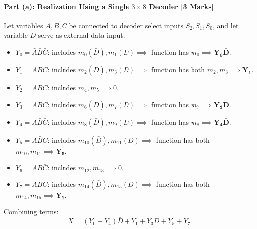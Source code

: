 \documentclass[11pt,a4paper,oneside]{book}
\begin{document}
\paragraph{Part (a): Realization Using a Single $3 \times 8$ Decoder [3 Marks]}
Let variables $A, B, C$ be connected to decoder select inputs $S_2, S_1, S_0$, and let variable $D$ serve as external data input:
\begin{itemize}
  \item $Y_0 = \bar{A}\bar{B}\bar{C}$: includes $m_0(\bar{D}), m_1(D) \implies$ function has $m_0 \implies \mathbf{Y_0 \bar{D}}$.
  \item $Y_1 = \bar{A}\bar{B}C$: includes $m_2(\bar{D}), m_3(D) \implies$ function has both $m_2, m_3 \implies \mathbf{Y_1}$.
  \item $Y_2 = \bar{A}B\bar{C}$: includes $m_4, m_5 \implies 0$.
  \item $Y_3 = \bar{A}BC$: includes $m_6(\bar{D}), m_7(D) \implies$ function has $m_7 \implies \mathbf{Y_3 D}$.
  \item $Y_4 = A\bar{B}\bar{C}$: includes $m_8(\bar{D}), m_9(D) \implies$ function has $m_8 \implies \mathbf{Y_4 \bar{D}}$.
  \item $Y_5 = A\bar{B}C$: includes $m_{10}(\bar{D}), m_{11}(D) \implies$ function has both $m_{10}, m_{11} \implies \mathbf{Y_5}$.
  \item $Y_6 = AB\bar{C}$: includes $m_{12}, m_{13} \implies 0$.
  \item $Y_7 = ABC$: includes $m_{14}(\bar{D}), m_{15}(D) \implies$ function has both $m_{14}, m_{15} \implies \mathbf{Y_7}$.
\end{itemize}
Combining terms:
\[
X = (Y_0 + Y_4)\bar{D} + Y_1 + Y_3 D + Y_5 + Y_7
\]
\end{document}
